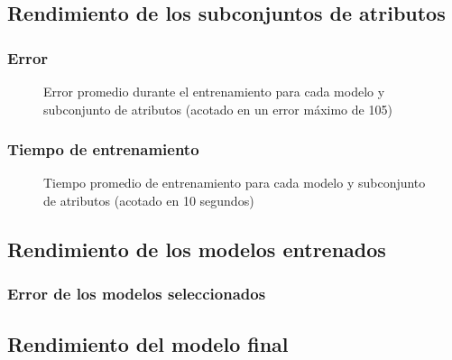 \subsection{Rendimiento de los subconjuntos de atributos}

\subsubsection{Error}

\begin{figure}[h]
	\centering
	\captionsetup{belowskip=-15pt, justification=centering}
	\caption{Error promedio durante el entrenamiento para cada modelo y subconjunto de atributos (acotado en un error máximo de 105)}
	\label{fig:ch5trainerror}
\end{figure}

\subsubsection{Tiempo de entrenamiento}

\begin{figure}[h]
	\centering
	\captionsetup{belowskip=-15pt, justification=centering}
	\caption{Tiempo promedio de entrenamiento para cada modelo y subconjunto de atributos (acotado en 10 segundos)}
	\label{fig:ch5traintime}
\end{figure}

\subsection{Rendimiento de los modelos entrenados}

\subsubsection{Error de los modelos seleccionados}

\subsection{Rendimiento del modelo final}